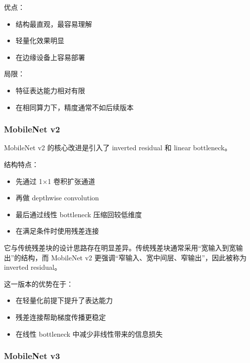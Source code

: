 优点：

\begin{itemize}
\tightlist
\item
  结构最直观，最容易理解
\item
  轻量化效果明显
\item
  在边缘设备上容易部署
\end{itemize}

局限：

\begin{itemize}
\tightlist
\item
  特征表达能力相对有限
\item
  在相同算力下，精度通常不如后续版本
\end{itemize}

\subsubsection{MobileNet v2}\label{src-experiment-case2-h10}

MobileNet v2 的核心改进是引入了 inverted residual 和 linear bottleneck。

结构特点：

\begin{itemize}
\tightlist
\item
  先通过 1×1 卷积扩张通道
\item
  再做 depthwise convolution
\item
  最后通过线性 bottleneck 压缩回较低维度
\item
  在满足条件时使用残差连接
\end{itemize}

它与传统残差块的设计思路存在明显差异。传统残差块通常采用``宽输入到宽输出''的结构，而
MobileNet v2 更强调``窄输入、宽中间层、窄输出''，因此被称为 inverted
residual。

这一版本的优势在于：

\begin{itemize}
\tightlist
\item
  在轻量化前提下提升了表达能力
\item
  残差连接帮助梯度传播更稳定
\item
  在线性 bottleneck 中减少非线性带来的信息损失
\end{itemize}

\subsubsection{MobileNet v3}\label{src-experiment-case2-h11}

